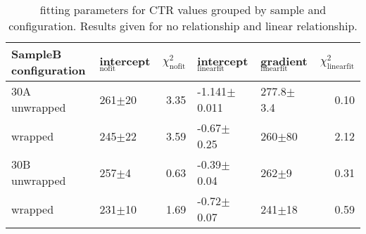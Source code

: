 \begin{table}
\caption{\label{tab:ctrfitresults} fitting parameters for CTR values grouped by sample and configuration. Results given for no relationship and linear relationship.}
\begin{tabular}{llrllr}
\hline
SampleB configuration & intercept$_\text{nofit}$ &  $\chi^2_\text{nofit}$ & intercept$_\text{linearfit}$ & gradient$_\text{linearfit}$ &  $\chi^2_\text{linearfit}$ \\
\hline
30A     unwrapped     &      261$\pm$20 &                   3.35 &    -1.141$\pm$0.011 &      277.8$\pm$3.4 &                    0.10 \\
        wrapped       &      245$\pm$22 &                   3.59 &      -0.67$\pm$0.25 &       260$\pm$80 &                    2.12 \\
30B     unwrapped     &       257$\pm$4 &                   0.63 &      -0.39$\pm$0.04 &          262$\pm$9 &                    0.31 \\
        wrapped       &      231$\pm$10 &                   1.69 &      -0.72$\pm$0.07 &         241$\pm$18 &                    0.59 \\
\hline
\end{tabular}
\end{table}